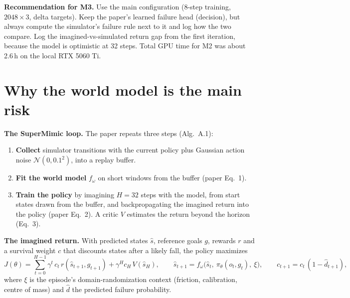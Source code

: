 \documentclass[10pt]{article}
\begin{document}
\textbf{Recommendation for M3.} Use the main configuration (8-step training, $2048{\times}3$, delta
targets). Keep the paper's learned failure head (decision), but always compute the simulator's failure
rule next to it and log how the two compare. Log the imagined-vs-simulated return gap from the first
iteration, because the model is optimistic at 32 steps. Total GPU time for M2 was about 2.6\,h on the local RTX 5060 Ti.

\section{Why the world model is the main risk}

\textbf{The SuperMimic loop.} The paper repeats three steps (Alg.~A.1):
\begin{enumerate}
  \item \textbf{Collect} simulator transitions with the current policy plus Gaussian action noise
  $\mathcal N(0, 0.1^2)$, into a replay buffer.
  \item \textbf{Fit the world model} $f_\omega$ on short windows from the buffer (paper Eq.~1).
  \item \textbf{Train the policy} by imagining $H = 32$ steps with the model, from start states drawn
  from the buffer, and backpropagating the imagined return into the policy (paper Eq.~2). A critic
  $V$ estimates the return beyond the horizon (Eq.~3).
\end{enumerate}

\textbf{The imagined return.} With predicted states $\hat s$, reference goals $g$, rewards $r$ and a
survival weight $c$ that discounts states after a likely fall, the policy maximizes
\[
J(\theta) = \sum_{t=0}^{H-1} \gamma^t\, c_t\, r(\hat s_{t+1}, g_{t+1}) + \gamma^H c_H\, V(\hat s_H),
\qquad
\hat s_{t+1} = f_\omega\big(\hat s_t,\ \pi_\theta(o_t, g_t),\ \xi\big),
\qquad c_{t+1} = c_t\,(1 - \hat d_{t+1}),
\]
where $\xi$ is the episode's domain-randomization context (friction, calibration, centre of mass) and
$\hat d$ the predicted failure probability.
\end{document}
